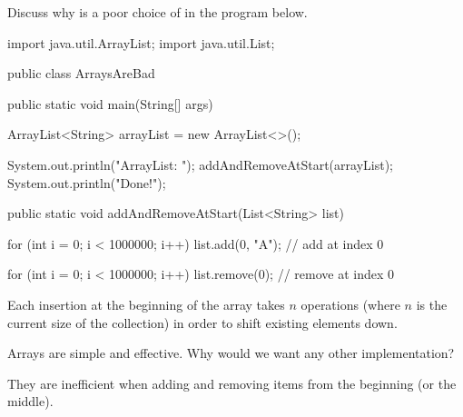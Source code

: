 \Q \label{ArraysAreBad}
Discuss why  is a poor choice of  in the program below.

\vspace{1ex}
\begin{javabox}
import java.util.ArrayList;
import java.util.List;

public class ArraysAreBad
{
    public static void main(String[] args)
    {
        ArrayList<String> arrayList = new ArrayList<>();

        System.out.println("ArrayList: ");
        addAndRemoveAtStart(arrayList);
        System.out.println("Done!");
    }

    public static void addAndRemoveAtStart(List<String> list)
    {
        for (int i = 0; i < 1000000; i++)
        {
            list.add(0, "A");  // add at index 0
        }

        for (int i = 0; i < 1000000; i++)
        {
            list.remove(0);  // remove at index 0
        }
    }
}
\end{javabox}
\vspace{-1ex}

\begin{answer}[3em]
Each insertion at the beginning of the array takes $n$ operations (where $n$ is the current size of the collection) in order to shift existing elements down.
\end{answer}


\Q Arrays are simple and effective. Why would we want any other implementation?

\begin{answer}
They are inefficient when adding and removing items from the beginning (or the middle).
\end{answer}

